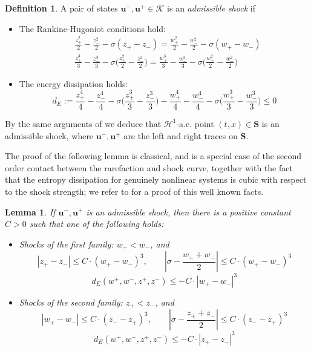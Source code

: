 \documentclass[11pt, twoside, reqno]{amsart}
\newtheorem{lemma}[thm]{Lemma}
\theoremstyle{definition}
\newtheorem{defi}[thm]{Definition}
\theoremstyle{remark}
\numberwithin{equation}{section}
\newcommand{\mc}[1]{\mathcal{#1}}
\newcommand{\bs}[1]{\boldsymbol{#1}}
\begin{document}
\begin{defi}
    A pair of states $\bs u^-, \bs u^+ \in \mc K$  is an \emph{admissible shock} if 
    \begin{itemize}
        \item The Rankine-Hugoniot conditions hold:
          \begin{equation}\label{eq:RHiso}
        \begin{aligned}
        & \frac{z_+^2}{2}-\frac{z_-^2}{2} - \sigma (z_+ - z_-) =       \frac{w_+^2}{2}-\frac{w_-^2}{2} - \sigma (w_+ - w_-)  \\
        & \frac{z_+^3}{3}-\frac{z_-^3}{3} - \sigma \Big(\frac{z_+^2}{2} - \frac{z_-^2}{2}\Big) =       \frac{w_+^3}{3}-\frac{w_-^3}{3} - \sigma \Big(\frac{w_+^2}{2} - \frac{w_-^2}{2}\Big)
        \end{aligned}
    \end{equation}
    \item  The energy dissipation holds:
    \begin{equation}\label{eq:dissiso}
        d_E:= \frac{z_+^4}{4}-\frac{z_-^4}{4} - \sigma \Big(\frac{z_+^3}{3} - \frac{z_-^3}{3}\Big) -       \frac{w_+^4}{4}-\frac{w_-^4}{4} - \sigma \Big(\frac{w_+^3}{3} - \frac{w_-^3}{3}\Big) \leq 0
    \end{equation}
    \end{itemize}
\end{defi}

By the same arguments of \cite{DOW03} we deduce that $\mathscr H^1$-a.e. point $(t,x) \in \mathbf S$ is an admissible shock, where $\bs u^-, \bs u^+$ are the left and right traces on $\mathbf S$.




The proof of the following lemma is classical, and is a special case of the second order contact between the rarefaction and shock curve, together with the fact that the entropy dissipation for genuinely nonlinear systems is cubic with respect to the shock strength; we refer to \cite[Chapter 5]{Bbook} for a proof of this well known facts.
\begin{lemma}\label{lemma:shockstru}
If $\bs u^-, \bs u^+$ is an admissible shock, then there is a positive constant $C > 0$ such that one of the following holds:
\begin{itemize}
    \item[(a)] Shocks of the first family: $w_+ < w_-$, and 
    $$
    |z_+-z_-| \leq C\cdot (w_+-w_-)^3, \qquad \left|\sigma - \frac{w_++w_-}{2}\right| \leq C\cdot (w_+-w_-)^3
    $$
    $$
    d_E(w^+, w^-, z^+, z^-) \leq -C \cdot |w_+-w_-|^3
    $$
    \item[(b)] Shocks of the second family: $z_+ < z_-$, and 
    $$
    |w_+-w_-| \leq C\cdot (z_--z_+)^3, \qquad \left|\sigma - \frac{z_++z_-}{2}\right| \leq C\cdot (z_--z_+)^3
    $$
    $$
    d_E(w^+, w^-, z^+, z^-) \leq - C \cdot|z_+-z_-|^3
    $$
    \end{itemize}
\end{lemma}
\end{document}
